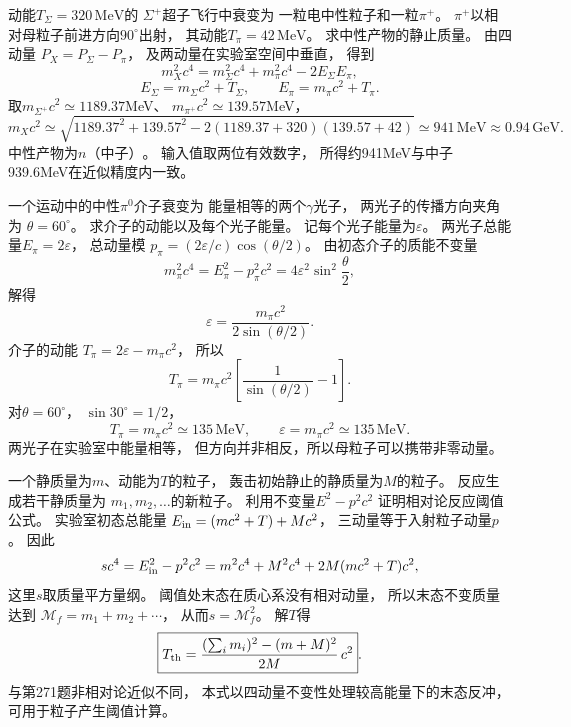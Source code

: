 动能$T_\Sigma=320\,\mathrm{MeV}$的
$\Sigma^+$超子飞行中衰变为
一粒电中性粒子和一粒$\pi^+$。
$\pi^+$以相对母粒子前进方向$90^\circ$出射，
其动能$T_\pi=42\,\mathrm{MeV}$。
求中性产物的静止质量。
\exsolution
由四动量
$P_X=P_\Sigma-P_\pi$，
及两动量在实验室空间中垂直，
得到
\[
 m_X^2c^4=
 m_\Sigma^2c^4+m_\pi^2c^4-2E_\Sigma E_\pi,
\]
\[
 E_\Sigma=m_\Sigma c^2+T_\Sigma,\qquad
 E_\pi=m_\pi c^2+T_\pi.
\]
取$m_{\Sigma^+}c^2\simeq1189.37$MeV、
$m_{\pi^+}c^2\simeq139.57$MeV，
\[
 \boxed{m_Xc^2\simeq
 \sqrt{1189.37^2+139.57^2-
 2(1189.37+320)(139.57+42)}
 \simeq941\,\mathrm{MeV}\approx0.94\,\mathrm{GeV}}.
\]
中性产物为$\boxed{n\text{（中子）}}$。
\excheck 输入值取两位有效数字，
所得约941MeV与中子939.6MeV在近似精度内一致。

一个运动中的中性$\pi^0$介子衰变为
能量相等的两个$\gamma$光子，
两光子的传播方向夹角为
$\theta=60^\circ$。
求介子的动能以及每个光子能量。
\exsolution
记每个光子能量为$\varepsilon$。
两光子总能量$E_\pi=2\varepsilon$，
总动量模
$p_\pi=(2\varepsilon/c)\cos(\theta/2)$。
由初态介子的质能不变量
\[
 m_\pi^2c^4=E_\pi^2-p_\pi^2c^2
 =4\varepsilon^2\sin^2\frac{\theta}{2},
\]
解得
\[
 \boxed{\varepsilon=
 \frac{m_\pi c^2}{2\sin(\theta/2)}}.
\]
介子的动能
$T_\pi=2\varepsilon-m_\pi c^2$，
所以
\[
 \boxed{T_\pi=m_\pi c^2
 \left[\frac1{\sin(\theta/2)}-1\right]}.
\]
对$\theta=60^\circ$，
$\sin30^\circ=1/2$，
\[
 \boxed{T_\pi=m_\pi c^2\simeq135\,\mathrm{MeV}},\qquad
 \boxed{\varepsilon=m_\pi c^2\simeq135\,\mathrm{MeV}}.
\]
\excheck 两光子在实验室中能量相等，
但方向并非相反，所以母粒子可以携带非零动量。

一个静质量为$m$、动能为$T$的粒子，
轰击初始静止的静质量为$M$的粒子。
反应生成若干静质量为
$m_1,m_2,\ldots$的新粒子。
利用不变量$E^2-p^2c^2$
证明相对论反应阈值公式。
\exsolution
实验室初态总能量
$E_{\rm in}=(mc^2+T)+Mc^2$，
三动量等于入射粒子动量$p$。
因此
\[
 s c^4=E_{\rm in}^2-p^2c^2
 =m^2c^4+M^2c^4+2M(mc^2+T)c^2,
\]
这里$s$取质量平方量纲。
阈值处末态在质心系没有相对动量，
所以末态不变质量达到
$\mathcal M_f=m_1+m_2+\cdots$，
从而$s=\mathcal M_f^2$。
解$T$得
\[
 \boxed{T_{\rm th}=
 \frac{(\sum_i m_i)^2-(m+M)^2}
 {2M}\,c^2}.
\]
\excheck 与第271题非相对论近似不同，
本式以四动量不变性处理较高能量下的末态反冲，
可用于粒子产生阈值计算。

